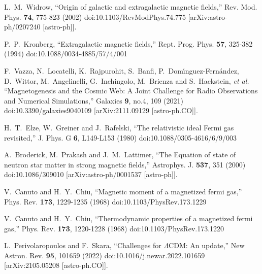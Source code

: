 \begin{thebibliography}{99}
L.~M.~Widrow,
``Origin of galactic and extragalactic magnetic fields,''
Rev. Mod. Phys. \textbf{74}, 775-823 (2002)
doi:10.1103/RevModPhys.74.775
[arXiv:astro-ph/0207240 [astro-ph]].

P.~P.~Kronberg,
``Extragalactic magnetic fields,''
Rept. Prog. Phys. \textbf{57}, 325-382 (1994)
doi:10.1088/0034-4885/57/4/001

F.~Vazza, N.~Locatelli, K.~Rajpurohit, S.~Banfi, P.~Dom\'\i{}nguez-Fern\'andez, D.~Wittor, M.~Angelinelli, G.~Inchingolo, M.~Brienza and S.~Hackstein, \textit{et al.}
``Magnetogenesis and the Cosmic Web: A Joint Challenge for Radio Observations and Numerical Simulations,''
Galaxies \textbf{9}, no.4, 109 (2021)
doi:10.3390/galaxies9040109
[arXiv:2111.09129 [astro-ph.CO]].

H.~T.~Elze, W.~Greiner and J.~Rafelski,
``The relativistic ideal Fermi gas revisited,''
J. Phys. G \textbf{6}, L149-L153 (1980)
doi:10.1088/0305-4616/6/9/003

A.~Broderick, M.~Prakash and J.~M.~Lattimer,
``The Equation of state of neutron star matter in strong magnetic fields,''
Astrophys. J. \textbf{537}, 351 (2000)
doi:10.1086/309010
[arXiv:astro-ph/0001537 [astro-ph]].

V.~Canuto and H.~Y.~Chiu,
``Magnetic moment of a magnetized fermi gas,''
Phys. Rev. \textbf{173}, 1229-1235 (1968)
doi:10.1103/PhysRev.173.1229

V.~Canuto and H.~Y.~Chiu,
``Thermodynamic properties of a magnetized fermi gas,''
Phys. Rev. \textbf{173}, 1220-1228 (1968)
doi:10.1103/PhysRev.173.1220

L.~Perivolaropoulos and F.~Skara,
``Challenges for \ensuremath{\Lambda}CDM: An update,''
New Astron. Rev. \textbf{95}, 101659 (2022)
doi:10.1016/j.newar.2022.101659
[arXiv:2105.05208 [astro-ph.CO]].


\end{thebibliography}
